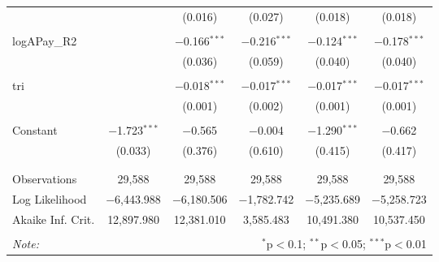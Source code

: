 \begin{table}[!htbp]
\begin{tabular}{@{\extracolsep{5pt}}lccccc}
  &  & (0.016) & (0.027) & (0.018) & (0.018) \\ 
  & & & & & \\ 
 logAPay\_R2 &  & $-$0.166$^{***}$ & $-$0.216$^{***}$ & $-$0.124$^{***}$ & $-$0.178$^{***}$ \\ 
  &  & (0.036) & (0.059) & (0.040) & (0.040) \\ 
  & & & & & \\ 
 tri &  & $-$0.018$^{***}$ & $-$0.017$^{***}$ & $-$0.017$^{***}$ & $-$0.017$^{***}$ \\ 
  &  & (0.001) & (0.002) & (0.001) & (0.001) \\ 
  & & & & & \\ 
 Constant & $-$1.723$^{***}$ & $-$0.565 & $-$0.004 & $-$1.290$^{***}$ & $-$0.662 \\ 
  & (0.033) & (0.376) & (0.610) & (0.415) & (0.417) \\ 
  & & & & & \\ 
\hline \\[-1.8ex] 
Observations & 29,588 & 29,588 & 29,588 & 29,588 & 29,588 \\ 
Log Likelihood & $-$6,443.988 & $-$6,180.506 & $-$1,782.742 & $-$5,235.689 & $-$5,258.723 \\ 
Akaike Inf. Crit. & 12,897.980 & 12,381.010 & 3,585.483 & 10,491.380 & 10,537.450 \\ 
\hline 
\hline \\[-1.8ex] 
\textit{Note:}  & \multicolumn{5}{r}{$^{*}$p$<$0.1; $^{**}$p$<$0.05; $^{***}$p$<$0.01} \\ 
\end{tabular} 
\end{table} 
